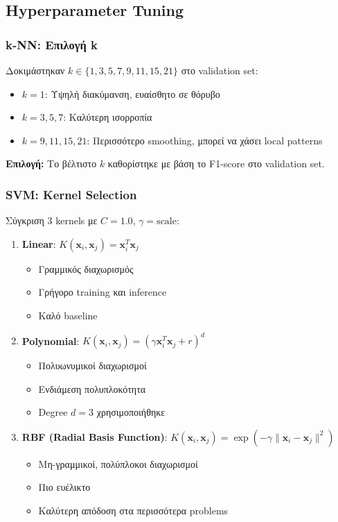 \documentclass[12pt,a4paper,twoside]{book}
\begin{document}
\subsection{Hyperparameter Tuning}

\subsubsection*{k-NN: Επιλογή k}

Δοκιμάστηκαν \(k \in \{1, 3, 5, 7, 9, 11, 15, 21\}\) στο validation set:

\begin{itemize}
    \item \(k=1\): Υψηλή διακύμανση, ευαίσθητο σε θόρυβο
    \item \(k=3, 5, 7\): Καλύτερη ισορροπία
    \item \(k=9, 11, 15, 21\): Περισσότερο smoothing, μπορεί να χάσει local patterns
\end{itemize}

\textbf{Επιλογή:} Το βέλτιστο \(k\) καθορίστηκε με βάση το F1-score στο validation set.

\subsubsection*{SVM: Kernel Selection}

Σύγκριση 3 kernels με \(C=1.0\), \(\gamma=\text{scale}\):

\begin{enumerate}
    \item \textbf{Linear}: \(K(\mathbf{x}_i, \mathbf{x}_j) = \mathbf{x}_i^T \mathbf{x}_j\)
          \begin{itemize}
              \item Γραμμικός διαχωρισμός
              \item Γρήγορο training και inference
              \item Καλό baseline
          \end{itemize}

    \item \textbf{Polynomial}: \(K(\mathbf{x}_i, \mathbf{x}_j) = (\gamma \mathbf{x}_i^T \mathbf{x}_j + r)^d\)
          \begin{itemize}
              \item Πολυωνυμικοί διαχωρισμοί
              \item Ενδιάμεση πολυπλοκότητα
              \item Degree \(d=3\) χρησιμοποιήθηκε
          \end{itemize}

    \item \textbf{RBF (Radial Basis Function)}: \(K(\mathbf{x}_i, \mathbf{x}_j) = \exp(-\gamma \|\mathbf{x}_i - \mathbf{x}_j\|^2)\)
          \begin{itemize}
              \item Μη-γραμμικοί, πολύπλοκοι διαχωρισμοί
              \item Πιο ευέλικτο
              \item Καλύτερη απόδοση στα περισσότερα problems
          \end{itemize}
\end{enumerate}
\end{document}
